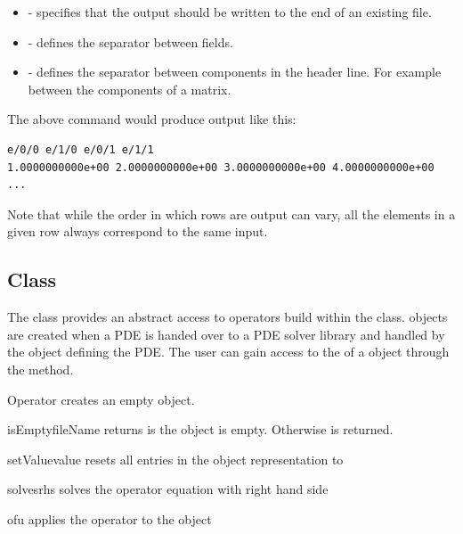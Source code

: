 \begin{itemize}
 \item {} - specifies that the output should be written to the end of an existing file.
\item {} - defines the separator between fields.
\item {} - defines the separator between components in the header line. For example between the components of a matrix. 
\end{itemize}

The above command would produce output like this:
\begin{verbatim}
e/0/0 e/1/0 e/0/1 e/1/1
1.0000000000e+00 2.0000000000e+00 3.0000000000e+00 4.0000000000e+00
... 
\end{verbatim}

Note that while the order in which rows are output can vary, all the elements in a given row
always correspond to the same input.


\subsection{\Operator Class}
The \Operator class provides an abstract access to operators build
within the \LinearPDE class. \Operator objects are created 
when a PDE is handed over to a PDE solver library and handled
by the \LinearPDE object defining the PDE. The user can gain access
to the \Operator of a \LinearPDE object through the 
method.

\begin{classdesc}{Operator}{}
creates an empty \Operator object.
\end{classdesc}

\begin{methoddesc}[Operator]{isEmpty}{fileName}
returns \True is the object is empty. Otherwise \True is returned.
\end{methoddesc}

\begin{methoddesc}[Operator]{setValue}{value}
resets all entries in the object representation to 
\end{methoddesc}

\begin{methoddesc}[Operator]{solves}{rhs}
solves the operator equation with right hand side 
\end{methoddesc}

\begin{methoddesc}[Operator]{of}{u}
applies the operator to the \Data object 
\end{methoddesc}

